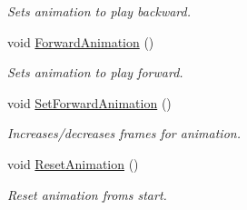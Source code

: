 \begin{DoxyCompactItemize}
\begin{DoxyCompactList}\small\item\em Sets animation to play backward. \end{DoxyCompactList}\item 
void \hyperlink{class_character_ae31c697a6108c3e114815b1d95be80d9}{Forward\+Animation} ()\hypertarget{class_character_ae31c697a6108c3e114815b1d95be80d9}{}\label{class_character_ae31c697a6108c3e114815b1d95be80d9}

\begin{DoxyCompactList}\small\item\em Sets animation to play forward. \end{DoxyCompactList}\item 
void \hyperlink{class_character_a57701fbb44ec55932b780d01a12195c7}{Set\+Forward\+Animation} ()\hypertarget{class_character_a57701fbb44ec55932b780d01a12195c7}{}\label{class_character_a57701fbb44ec55932b780d01a12195c7}

\begin{DoxyCompactList}\small\item\em Increases/decreases frames for animation. \end{DoxyCompactList}\item 
void \hyperlink{class_character_a6ffa431ffdcb6e6eb5ca3d0b46d8be2c}{Reset\+Animation} ()\hypertarget{class_character_a6ffa431ffdcb6e6eb5ca3d0b46d8be2c}{}\label{class_character_a6ffa431ffdcb6e6eb5ca3d0b46d8be2c}

\begin{DoxyCompactList}\small\item\em Reset animation froms start. \end{DoxyCompactList}\end{DoxyCompactItemize}

